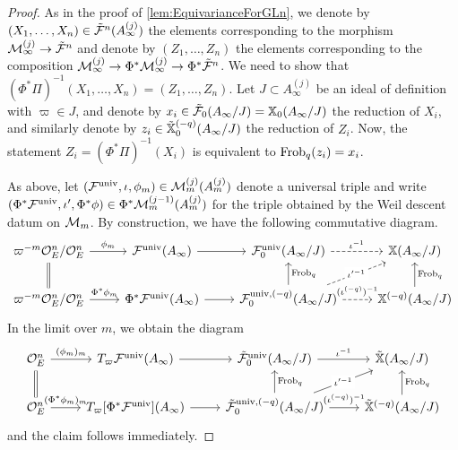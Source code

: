 \documentclass[../main.tex]{subfiles}
\begin{document}
\begin{proof}
    As in the proof of \cref{lem:EquivarianceForGLn}, we denote by $(X_1, \dots, X_n) \in \tilde {\mathcal{F}}^n(A_\infty^{(j)})$
    the elements corresponding to the morphism
    $\mathcal{M}_\infty^{(j)} \to \tilde {\mathcal{F}}^n$ and denote by 
    $(Z_1, \dots, Z_n)$ the elements corresponding to the composition
    $\mathcal{M}_\infty^{(j)} \to \Phi^*\mathcal{M}_\infty^{(j)} \to \Phi^*\tilde {\mathcal{F}}^n$.
    We need to show that $(\Phi^* \Pi)^{-1}(X_1, \dots, X_n) = (Z_1, \dots, Z_n)$.
    Let $J \subset A_\infty^{(j)}$ be an ideal of definition with 
    $\varpi \in J$, and denote by $x_i \in \tilde {\mathcal{F}}_0(A_\infty/J) = \mathbb{X}_0(A_\infty/J)$ the reduction 
    of $X_i$, and similarly denote by $z_i \in \tilde {\mathbb{X}}^{(-q)}_0(A_\infty/J)$ the reduction 
    of $Z_i$. Now, the statement $Z_i = (\Phi^* \Pi)^{-1}(X_i)$ is equivalent to $\mathrm{Frob}_q(z_i) = x_i$.

     As above, let $(\mathcal{F}^{\mathrm{univ}}, \iota, \phi_m) \in \mathcal{M}_m^{(j)}(A_m^{(j)})$ denote a universal
     triple and write 
     $(\Phi^*\mathcal{F}^{\mathrm{univ}}, \iota', \Phi^* \phi) \in \Phi^* \mathcal{M}_m^{(j-1)}(A_m^{(j)})$ for the 
     triple obtained by the Weil descent datum on $\mathcal{M}_m$. By construction, we have the following commutative diagram.
\begin{equation*}
\begin{tikzcd}[ampersand replacement=\&]
	{\varpi^{-m}\cO_E^n/\cO_E^n} \& {\cF^\univ(A_\infty)} \& { \cF^\univ_0(A_\infty/J)} \& {\XX(A_\infty/J)} \\
	{\varpi^{-m}\cO_E^n/\cO_E^n} \& {\Phi^*\cF^\univ(A_\infty)} \& { \cF^{\univ,{(-q)}}_0(A_\infty/J)} \& { \XX^{(-q)}(A_\infty/J)}
	\arrow["{\phi_m}", from=1-1, to=1-2]
	\arrow[Rightarrow, no head, from=1-1, to=2-1]
	\arrow[from=1-2, to=1-3]
	\arrow["{\iota^{-1}}", dashed, from=1-3, to=1-4]
	\arrow["{\Phi^*\phi_m}", from=2-1, to=2-2]
	\arrow[from=2-2, to=2-3]
	\arrow["{\Frob_q}"', from=2-3, to=1-3]
	\arrow["{\iota'^{-1}}"{description}, dashed, from=2-3, to=1-4]
	\arrow["{(\iota^{(-q)})^{-1}}", dashed, from=2-3, to=2-4]
	\arrow["{\Frob_q}"', from=2-4, to=1-4]
\end{tikzcd}
\end{equation*}
    In the limit over $m$, we obtain the diagram
    \begin{equation*}
\begin{tikzcd}[ampersand replacement=\&]
	{\cO_E^n} \& {T_\varpi\cF^\univ(A_\infty)} \& {\tilde \cF^\univ_0(A_\infty/J)} \& {\tilde \XX(A_\infty/J)} \\
	{\cO_E^n} \& {T_\varpi[\Phi^*\cF^\univ](A_\infty)} \& {\tilde \cF^{\univ,{(-q)}}_0(A_\infty/J)} \& {\tilde \XX^{(-q)}(A_\infty/J)}
	\arrow["{(\phi_m)_m}", from=1-1, to=1-2]
	\arrow[Rightarrow, no head, from=1-1, to=2-1]
	\arrow[from=1-2, to=1-3]
	\arrow["{\iota^{-1}}", from=1-3, to=1-4]
	\arrow["{(\Phi^*\phi_m)_m}", from=2-1, to=2-2]
	\arrow[from=2-2, to=2-3]
	\arrow["{\Frob_q}"', from=2-3, to=1-3]
	\arrow["{\iota'^{-1}}"{description}, from=2-3, to=1-4]
	\arrow["{(\iota^{(-q)})^{-1}}", from=2-3, to=2-4]
	\arrow["{\Frob_q}"', from=2-4, to=1-4]
\end{tikzcd}
    \end{equation*}
    and the claim follows immediately.
\end{proof}
\end{document}
